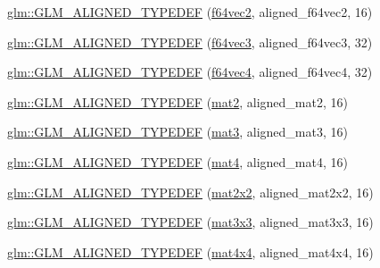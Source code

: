 \begin{DoxyCompactItemize}
\item 
\hyperlink{group__gtx__type__aligned_ga32814aa0f19316b43134fc25f2aad2b9}{glm\+::\+G\+L\+M\+\_\+\+A\+L\+I\+G\+N\+E\+D\+\_\+\+T\+Y\+P\+E\+D\+EF} (\hyperlink{group__gtc__type__precision_gacde4fe7b129521888cd30672c34650c5}{f64vec2}, aligned\+\_\+f64vec2, 16)
\item 
\hyperlink{group__gtx__type__aligned_gaf3d3bbc1e93909b689123b085e177a14}{glm\+::\+G\+L\+M\+\_\+\+A\+L\+I\+G\+N\+E\+D\+\_\+\+T\+Y\+P\+E\+D\+EF} (\hyperlink{group__gtc__type__precision_gac531875c6544b7919f36a86cbe538736}{f64vec3}, aligned\+\_\+f64vec3, 32)
\item 
\hyperlink{group__gtx__type__aligned_ga804c654cead1139bd250f90f9bb01fad}{glm\+::\+G\+L\+M\+\_\+\+A\+L\+I\+G\+N\+E\+D\+\_\+\+T\+Y\+P\+E\+D\+EF} (\hyperlink{group__gtc__type__precision_ga9d896f484039b22873e7bfb9e06f7b47}{f64vec4}, aligned\+\_\+f64vec4, 32)
\item 
\hyperlink{group__gtx__type__aligned_gafed7d010235a3aa7ea2f88646858f2ae}{glm\+::\+G\+L\+M\+\_\+\+A\+L\+I\+G\+N\+E\+D\+\_\+\+T\+Y\+P\+E\+D\+EF} (\hyperlink{group__core__types_ga8357ec0aab6f8cf69313592492663c3f}{mat2}, aligned\+\_\+mat2, 16)
\item 
\hyperlink{group__gtx__type__aligned_ga17f911ee7b78ca6d1b91c4ab51ddb73c}{glm\+::\+G\+L\+M\+\_\+\+A\+L\+I\+G\+N\+E\+D\+\_\+\+T\+Y\+P\+E\+D\+EF} (\hyperlink{group__core__types_gadfaff2a7dce5cbf4e77a47ecea42ac5b}{mat3}, aligned\+\_\+mat3, 16)
\item 
\hyperlink{group__gtx__type__aligned_ga31940e6012b72110e26fdb0f54805033}{glm\+::\+G\+L\+M\+\_\+\+A\+L\+I\+G\+N\+E\+D\+\_\+\+T\+Y\+P\+E\+D\+EF} (\hyperlink{group__core__types_ga7dcd2365c2e368e6af5b7adeb6a9c8df}{mat4}, aligned\+\_\+mat4, 16)
\item 
\hyperlink{group__gtx__type__aligned_ga01de96cd0b541c52d2b4a3faf65822e9}{glm\+::\+G\+L\+M\+\_\+\+A\+L\+I\+G\+N\+E\+D\+\_\+\+T\+Y\+P\+E\+D\+EF} (\hyperlink{group__core__types_gaeddc14adb4963d9bad73866cc202fb40}{mat2x2}, aligned\+\_\+mat2x2, 16)
\item 
\hyperlink{group__gtx__type__aligned_gac88a191b004bd341e64fc53b5a4d00e3}{glm\+::\+G\+L\+M\+\_\+\+A\+L\+I\+G\+N\+E\+D\+\_\+\+T\+Y\+P\+E\+D\+EF} (\hyperlink{group__core__types_ga6fecca6a869070b6bf8acb44ce1c2af3}{mat3x3}, aligned\+\_\+mat3x3, 16)
\item 
\hyperlink{group__gtx__type__aligned_gabe8c745fa2ced44a600a6e3f19991161}{glm\+::\+G\+L\+M\+\_\+\+A\+L\+I\+G\+N\+E\+D\+\_\+\+T\+Y\+P\+E\+D\+EF} (\hyperlink{group__core__types_ga63e3ee9447ed593484140a9368e738ec}{mat4x4}, aligned\+\_\+mat4x4, 16)

\end{DoxyCompactItemize}

